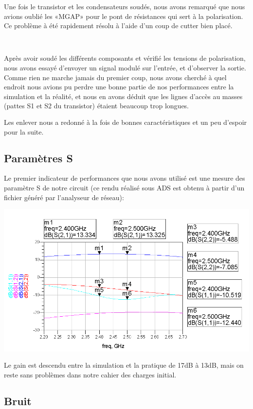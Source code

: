 \documentclass[12pt]{article}
\begin{document}
Une fois le transistor et les condensateurs soudés, nous avons remarqué que nous avions oublié les «MGAP» pour le pont de résistances qui sert à la polarisation. Ce problème à été rapidement résolu à l’aide d’un coup de cutter bien placé.

~

Après avoir soudé les différents composants et vérifié les tensions de polarisation, nous avons essayé d’envoyer un signal modulé sur l’entrée, et d’observer la sortie. Comme rien ne marche jamais du premier coup, nous avons cherché à quel endroit nous avions pu perdre une bonne partie de nos performances entre la simulation et la réalité, et nous en avons déduit que les lignes d’accès au masses (pattes S1 et S2 du transistor) étaient beaucoup trop longues. 

Les enlever nous a redonné à la fois de bonnes caractéristiques et un peu d’espoir pour la suite.

\subsection{Paramètres S}
Le premier indicateur de performances que nous avons utilisé est une mesure des paramètre S de notre circuit (ce rendu réalisé sous ADS est obtenu à partir d’un fichier généré par l’analyseur de réseau):

\includegraphics[width=\linewidth]{img/S_reels}

Le gain est descendu entre la simulation et la pratique de 17dB à 13dB, mais on reste sans problèmes dans notre cahier des charges initial.

\subsection{Bruit}
\end{document}
